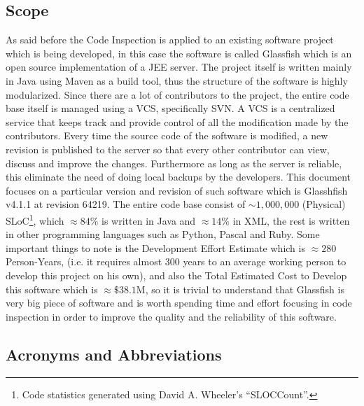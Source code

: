\subsection{Scope}
As said before the Code Inspection is applied to an existing software project which is being developed, in this case the software is called Glassfish which is an open source implementation of a JEE server.
The project itself is written mainly in Java using Maven as a build tool, thus the structure of the software is highly modularized. \newline
Since there are a lot of contributors to the project, the entire code base itself is managed using a VCS, specifically SVN. A VCS is a centralized service that keeps track and provide control of all the modification made by the contributors. Every time the source code of the software is modified, a new revision is published to the server so that every other contributor can view, discuss and improve the changes.
Furthermore as long as the server is reliable, this eliminate the need of doing local backups by the developers.\newline
This document focuses on a particular version and revision of such software which is Glasshfish v4.1.1 at revision 64219.
The entire code base consist of $\sim 1,000,000$ (Physical) SLoC\footnote{Code statistics generated using David A. Wheeler's ``SLOCCount''.}, which $\approx 84\%$ is written in Java and $\approx14\%$ in XML, the rest is written in other programming languages such as Python, Pascal and Ruby. Some important things to note is the Development Effort Estimate which is $\approx 280$ Person-Years, (i.e. it requires almost 300 years to an average working person to develop this project on his own), and also the Total Estimated Cost to Develop this software which is $\approx \$38.1$M, so it is trivial to understand that Glassfish is very big piece of software and is worth spending time and effort focusing in code inspection in order to improve the quality and the reliability of this software. 
\subsection{Acronyms and Abbreviations}
